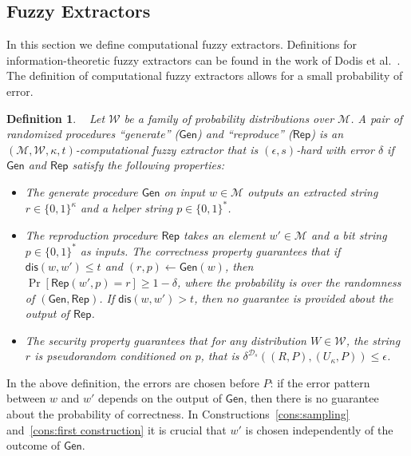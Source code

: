 \documentclass[11pt]{article}
\newcommand{\class}[1]{{\ensuremath{\mathsf{#1}}}}
\newcommand{\gen}{\ensuremath{\class{Gen}}\xspace}
\newcommand{\rep}{\ensuremath{\class{Rep}}\xspace}
\newcommand{\dis}{\ensuremath{\mathsf{dis}}}
\newtheorem{definition}[theorem]{Definition}
\begin{document}
\subsection{Fuzzy Extractors}
\label{sec:fuzzy extractors}

In this section we define computational fuzzy extractors.  Definitions for information-theoretic fuzzy extractors can be found in the work of Dodis et al.~\cite[Sections 2.5--4.1]{DBLP:journals/siamcomp/DodisORS08}.  The definition of computational fuzzy extractors allows for a small probability of error.  %

\begin{definition}~\cite[Definition 2.5]{fuller2013computational}
\label{def:comp fuzzy extractor}
Let $\mathcal{W}$ be a family of probability distributions over $\mathcal{M}$. A pair of randomized procedures ``generate'' ($\gen$) and ``reproduce'' ($\rep$) is an $(\mathcal{M}, \mathcal{W}, \kappa, t)$-\emph{computational fuzzy extractor} that is $(\epsilon, s)$-hard with error $\delta$ if \gen and \rep satisfy the following properties:
\begin{itemize}
\item The generate procedure \gen on input $w\in \mathcal{M}$ outputs an extracted string $r\in\{0,1\}^\kappa$ and a helper string $p\in\{0,1\}^*$.
\item The reproduction procedure \rep takes an element $w'\in\mathcal{M}$ and a bit string $p\in\{0,1\}^*$ as inputs.  The \emph{correctness} property guarantees that if $\dis(w, w')\leq t$ and $(r, p)\leftarrow \gen(w)$, then $\Pr[\rep( w', p) = r] \geq 1-\delta$, where the probability is over the randomness of $(\gen, \rep)$.
If $\dis(w, w') > t$, then no guarantee is provided about the output of \rep.
\item The \emph{security} property guarantees that for any distribution $W\in \mathcal{W}$, the string $r$ is pseudorandom conditioned on $p$, that is $\delta^{\mathcal{D}_s}((R, P), (U_\kappa, P))\leq \epsilon$.
\end{itemize}
\end{definition}
In the above definition, the errors are chosen before $P$: if the error pattern between $w$ and $w'$ depends on the output of $\gen$, then there is no guarantee about the probability of correctness. In Constructions~\ref{cons:sampling} and~\ref{cons:first construction} it is crucial that $w'$ is chosen independently of the outcome of \gen.  
\end{document}
